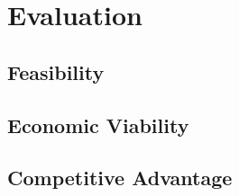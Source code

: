 \section{Evaluation}
\label{sec:evaluation}

\subsection{Feasibility}

\subsection{Economic Viability}

\subsection{Competitive Advantage}